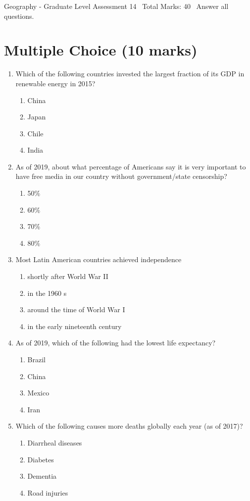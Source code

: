 \documentclass[12pt]{article}
\begin{document}
\begin{center}
Geography - Graduate Level Assessment 14 \
Total Marks: 40 \
Answer all questions.
\end{center}

\section*{Multiple Choice (10 marks)}
\begin{enumerate}[label=\arabic*.]
\item Which of the following countries invested the largest fraction of its GDP in renewable energy in 2015?
\begin{enumerate}[label=(\alph*)]
    \item China
    \item Japan
    \item Chile
    \item India
\end{enumerate}
\item As of 2019, about what percentage of Americans say it is very important to have free media in our country without government/state censorship?
\begin{enumerate}[label=(\alph*)]
    \item 50\%
    \item 60\%
    \item 70\%
    \item 80\%
\end{enumerate}
\item Most Latin American countries achieved independence
\begin{enumerate}[label=(\alph*)]
    \item shortly after World War II
    \item in the 1960 s
    \item around the time of World War I
    \item in the early nineteenth century
\end{enumerate}
\item As of 2019, which of the following had the lowest life expectancy?
\begin{enumerate}[label=(\alph*)]
    \item Brazil
    \item China
    \item Mexico
    \item Iran
\end{enumerate}
\item Which of the following causes more deaths globally each year (as of 2017)?
\begin{enumerate}[label=(\alph*)]
    \item Diarrheal diseases
    \item Diabetes
    \item Dementia
    \item Road injuries
\end{enumerate}
\end{enumerate}
\end{document}
